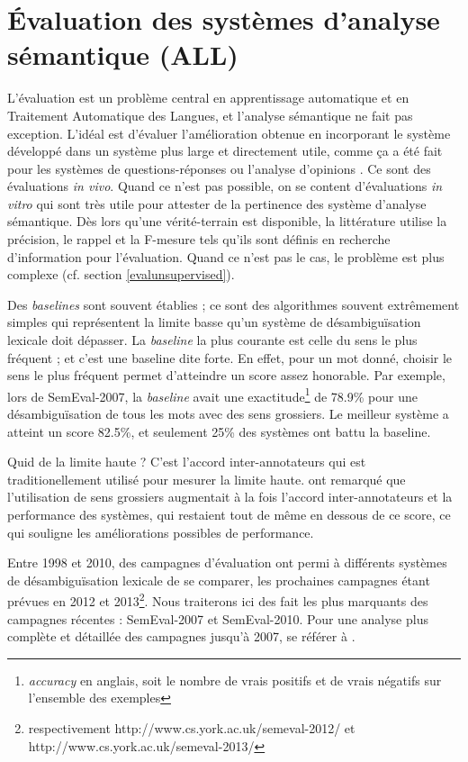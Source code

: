 
\section{Évaluation des systèmes d'analyse sémantique (ALL)}
\label{evaluation}

L'évaluation est un problème central en apprentissage automatique et en
Traitement Automatique des Langues, et l'analyse sémantique ne fait pas
exception. L'idéal est d'évaluer l'amélioration obtenue en incorporant le
système développé dans un système plus large et directement utile, comme ça a
été fait pour les systèmes de questions-réponses \citep{shen2007using} ou
l'analyse d'opinions \citep{das2012structure}. Ce sont des évaluations
\textit{in vivo}. Quand ce n'est pas possible, on se content d'évaluations
\textit{in vitro} qui sont très utile pour attester de la pertinence des
système d'analyse sémantique. Dès lors qu'une vérité-terrain est disponible, la
littérature utilise la précision, le rappel et la F-mesure tels qu'ils sont
définis en recherche d'information pour l'évaluation. Quand ce n'est pas le
cas, le problème est plus complexe (cf. section \ref{evalunsupervised}).

Des \textit{baselines} sont souvent établies ; ce sont des algorithmes souvent
extrêmement simples qui représentent la limite basse qu'un système de
désambiguïsation lexicale doit dépasser. La \textit{baseline} la plus courante
est celle du sens le plus fréquent ; et c'est une baseline dite forte. En
effet, pour un mot donné, choisir le sens le plus fréquent permet d'atteindre
un score assez honorable. Par exemple, lors de SemEval-2007, la
\textit{baseline} avait une exactitude\footnote{\textit{accuracy} en anglais,
soit le nombre de vrais positifs et de vrais négatifs sur l'ensemble des
exemples} de 78.9\% pour une désambiguïsation de tous les mots avec des sens
grossiers. Le meilleur système a atteint un score 82.5\%, et seulement 25\% des
systèmes ont battu la baseline.

Quid de la limite haute ? C'est l'accord inter-annotateurs qui est
traditionellement utilisé pour mesurer la limite haute.
\cite{navigli2007semeval} ont remarqué que l'utilisation de sens grossiers
augmentait à la fois l'accord inter-annotateurs et la performance des systèmes,
qui restaient tout de même en dessous de ce score, ce qui souligne les
améliorations possibles de performance.

Entre 1998 et 2010, des campagnes d'évaluation ont permi à différents systèmes
de désambiguïsation lexicale de se comparer, les prochaines campagnes étant
prévues en 2012 et 2013\footnote{respectivement
http://www.cs.york.ac.uk/semeval-2012/ et
http://www.cs.york.ac.uk/semeval-2013/}. Nous traiterons ici des fait les plus
marquants des campagnes récentes : SemEval-2007 et SemEval-2010. Pour une
analyse plus complète et détaillée des campagnes jusqu'à 2007, se référer à
\cite{navigli2009word}.

